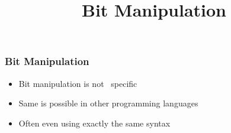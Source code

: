 \usepackage{siunitx}


\usetikzlibrary{shadows,shapes.multipart}

\title{Bit Manipulation}

\newcommand{\NOT}{\textasciitilde}
\newcommand{\XOR}{\textasciicircum}



\begin{frame}
  \titlepage
\end{frame}

\begin{frame}
  \frametitle{Bit Manipulation}
  \begin{itemize}
    \item Bit manipulation is not \cpp\ specific
    \item Same is possible in other programming languages
    \item Often even using exactly the same syntax
  \end{itemize}
\end{frame}

% 
% 
% 



